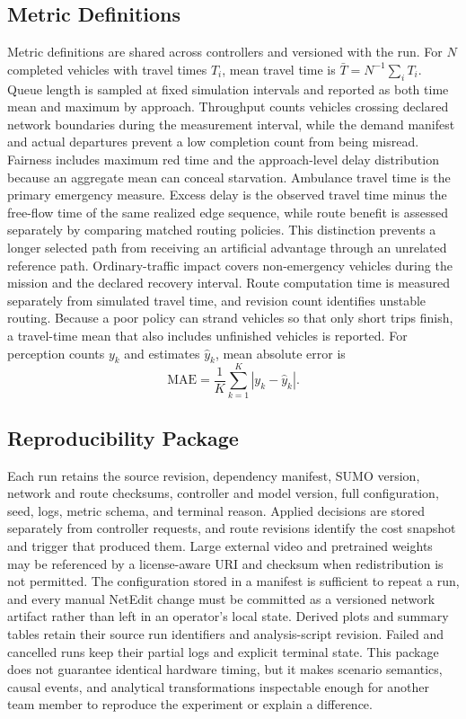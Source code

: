 \subsection{Metric Definitions}

Metric definitions are shared across controllers and versioned with the run. For $N$ completed vehicles with travel times $T_i$, mean travel time is $\bar{T}=N^{-1}\sum_iT_i$. Queue length is sampled at fixed simulation intervals and reported as both time mean and maximum by approach. Throughput counts vehicles crossing declared network boundaries during the measurement interval, while the demand manifest and actual departures prevent a low completion count from being misread. Fairness includes maximum red time and the approach-level delay distribution because an aggregate mean can conceal starvation. Ambulance travel time is the primary emergency measure. Excess delay is the observed travel time minus the free-flow time of the same realized edge sequence, while route benefit is assessed separately by comparing matched routing policies. This distinction prevents a longer selected path from receiving an artificial advantage through an unrelated reference path. Ordinary-traffic impact covers non-emergency vehicles during the mission and the declared recovery interval. Route computation time is measured separately from simulated travel time, and revision count identifies unstable routing. Because a poor policy can strand vehicles so that only short trips finish, a travel-time mean that also includes unfinished vehicles is reported. For perception counts $y_k$ and estimates $\hat{y}_k$, mean absolute error is
\begin{equation}
\mathrm{MAE}=\frac{1}{K}\sum_{k=1}^{K}|y_k-\hat{y}_k|.
\end{equation}

\subsection{Reproducibility Package}

Each run retains the source revision, dependency manifest, SUMO version, network and route checksums, controller and model version, full configuration, seed, logs, metric schema, and terminal reason. Applied decisions are stored separately from controller requests, and route revisions identify the cost snapshot and trigger that produced them. Large external video and pretrained weights may be referenced by a license-aware URI and checksum when redistribution is not permitted. The configuration stored in a manifest is sufficient to repeat a run, and every manual NetEdit change must be committed as a versioned network artifact rather than left in an operator's local state. Derived plots and summary tables retain their source run identifiers and analysis-script revision. Failed and cancelled runs keep their partial logs and explicit terminal state. This package does not guarantee identical hardware timing, but it makes scenario semantics, causal events, and analytical transformations inspectable enough for another team member to reproduce the experiment or explain a difference.

